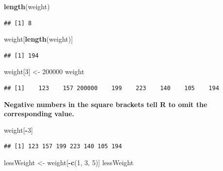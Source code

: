 \documentclass[]{article}
\newenvironment{Shaded}{\begin{snugshade}}{\end{snugshade}}
\newcommand{\KeywordTok}[1]{\textcolor[rgb]{0.13,0.29,0.53}{\textbf{#1}}}
\newcommand{\DecValTok}[1]{\textcolor[rgb]{0.00,0.00,0.81}{#1}}
\newcommand{\StringTok}[1]{\textcolor[rgb]{0.31,0.60,0.02}{#1}}
\newcommand{\OperatorTok}[1]{\textcolor[rgb]{0.81,0.36,0.00}{\textbf{#1}}}
\newcommand{\NormalTok}[1]{#1}
\begin{document}
\begin{Shaded}
\begin{Highlighting}[]
\KeywordTok{length}\NormalTok{(weight)}
\end{Highlighting}
\end{Shaded}

\begin{verbatim}
## [1] 8
\end{verbatim}

\begin{Shaded}
\begin{Highlighting}[]
\NormalTok{weight[}\KeywordTok{length}\NormalTok{(weight)]}
\end{Highlighting}
\end{Shaded}

\begin{verbatim}
## [1] 194
\end{verbatim}

\begin{Shaded}
\begin{Highlighting}[]
\NormalTok{weight[}\DecValTok{3}\NormalTok{] <-}\StringTok{ }\DecValTok{200000}
\NormalTok{weight}
\end{Highlighting}
\end{Shaded}

\begin{verbatim}
## [1]    123    157 200000    199    223    140    105    194
\end{verbatim}

\textbf{Negative numbers in the square brackets tell R to omit the
corresponding value.}

\begin{Shaded}
\begin{Highlighting}[]
\NormalTok{weight[}\OperatorTok{-}\DecValTok{3}\NormalTok{]}
\end{Highlighting}
\end{Shaded}

\begin{verbatim}
## [1] 123 157 199 223 140 105 194
\end{verbatim}

\begin{Shaded}
\begin{Highlighting}[]
\NormalTok{lessWeight <-}\StringTok{ }\NormalTok{weight[}\OperatorTok{-}\KeywordTok{c}\NormalTok{(}\DecValTok{1}\NormalTok{, }\DecValTok{3}\NormalTok{, }\DecValTok{5}\NormalTok{)]}
\NormalTok{lessWeight}
\end{Highlighting}
\end{Shaded}
\end{document}
